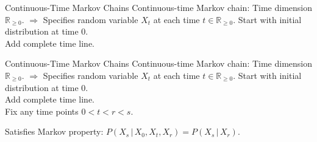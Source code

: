 \documentclass{beamer}
\begin{document}
\begin{frame}{Continuous-Time Markov Chains}
Continuous-time Markov chain: Time dimension $\mathbb{R}_{\geq 0}$.
\newline\newline
$\Rightarrow$ Specifies random variable $X_t$ at each time $t\in\mathbb{R}_{\geq 0}$.
\newline\newline
Start with initial distribution at time 0. \\
Add complete time line.\newline\newline\newline
{}
\quad\newline\newline
\end{frame}

\begin{frame}{Continuous-Time Markov Chains}
Continuous-time Markov chain: Time dimension $\mathbb{R}_{\geq 0}$.
\newline\newline
$\Rightarrow$ Specifies random variable $X_t$ at each time $t\in\mathbb{R}_{\geq 0}$.
\newline\newline
Start with initial distribution at time 0. \\
Add complete time line. \\
Fix any time points $0< t < r < s$. \newline\newline
{}
\quad\newline\newline\pause
Satisfies Markov property: $P(X_s\,\vert\,X_0,X_t,X_r)=P(X_s\,\vert\,X_r)$.
\end{frame}
\end{document}
